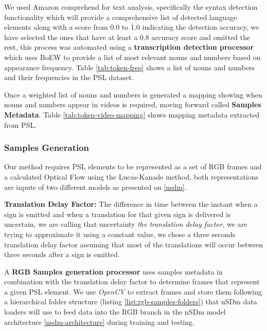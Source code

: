 \documentclass[twocolumn,conference]{article}
\begin{document}
We used Amazon comprehend for text analysis, specifically the syntax detection functionality which will provide a comprehensive list of detected language elements along with a score from 0.0 to 1.0 indicating the detection accuracy, we have selected the ones that have at least a 0.8 accuracy score and omitted the rest, this process was automated using a \textbf{transcription detection processor} which uses BoEW to provide a list of most relevant nouns and numbers based on appearance frequency. Table \ref{tab:token-freq} shows a list of nouns and numbers and their frequencies in the PSL dataset.

Once a weighted list of nouns and numbers is generated a mapping showing when nouns and numbers appear in videos is required, moving forward called \textbf{Samples Metadata}. Table \ref{tab:token-video-mapping} shows mapping metadata extracted from PSL.

\subsubsection{Samples Generation}\label{samples-generation} 
Our method requires PSL elements to be represented as a set of RGB frames and a calculated Optical Flow using the Lucas-Kanade method, both representations are inputs of two different models as presented on \ref{nsdm}.

\textbf{Translation Delay Factor: } The difference in time between the instant when a sign is emitted and when a translation for that given sign is delivered is uncertain, we are calling that uncertainty \textit{the translation delay factor}, we are trying to approximate it using a constant value, we chose a three seconds translation delay factor assuming that most of the translations will occur between three seconds after a sign is emitted.

A \textbf{RGB Samples generation processor} uses samples metadata in combination with the translation delay factor to determine frames that represent a given PSL element. We use \textit{OpenCV} to extract frames and store them following a hierarchical folder structure (listing \ref{list:rgb-samples-folders}) that nSDm data loaders will use to feed data into the RGB branch in the nSDm model architecture \ref{nsdm-architecture} during training and testing.
\end{document}

